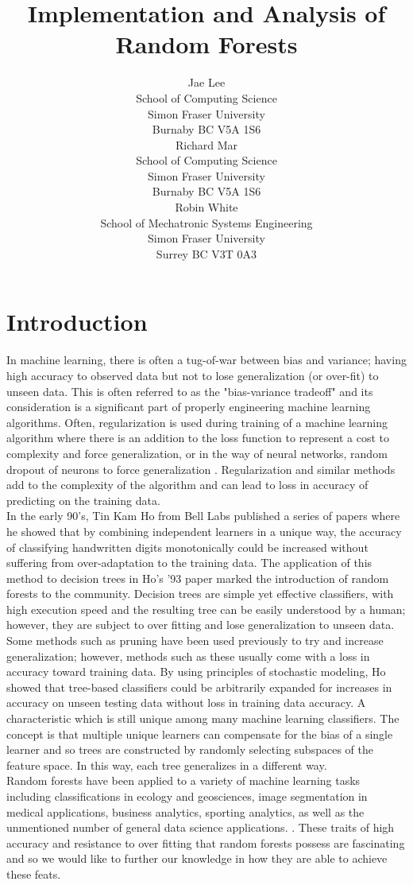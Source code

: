 \documentclass{article} %
\title{Implementation and Analysis of Random Forests}
\author{
Jae Lee\\
School of Computing Science\\
Simon Fraser University\\
Burnaby BC V5A 1S6 \\
\And
Richard Mar \\
School of Computing Science\\
Simon Fraser University\\
Burnaby BC V5A 1S6 \\
\AND
Robin White \\
School of Mechatronic Systems Engineering\\
Simon Fraser University\\
Surrey BC V3T 0A3 \\
}
\begin{document}
\maketitle

\section{Introduction}

In machine learning, there is often a tug-of-war between bias and variance; having high accuracy to observed data but not to lose generalization (or over-fit) to unseen data. This is often referred to as the "bias-variance tradeoff" and its consideration is a significant part of properly engineering machine learning algorithms. Often, regularization is used during training of a machine learning algorithm where there is an addition to the loss function to represent a cost to complexity and force generalization, or in the way of neural networks, random dropout of neurons to force generalization \cite{Srivastava2014}. Regularization and similar methods add to the complexity of the algorithm and can lead to loss in accuracy of predicting on the training data.\\
In the early 90's, Tin Kam Ho from Bell Labs published a series of papers where he showed that by combining independent learners in a unique way, the accuracy of classifying handwritten digits monotonically could be increased without suffering from over-adaptation to the training data. \cite{Ho93, Ho95, Ho98} The application of this method to decision trees in Ho's '93 paper marked the introduction of random forests to the community. \cite{Ho93} Decision trees are simple yet effective classifiers, with high execution speed and the resulting tree can be easily understood by a human; however, they are subject to over fitting and lose generalization to unseen data.  Some methods such as pruning have been used previously to try and increase generalization; however, methods such as these usually come with a loss in accuracy toward training data.  By using principles of stochastic modeling, Ho showed that tree-based classifiers could be arbitrarily expanded for increases in accuracy on unseen testing data without loss in training data accuracy. A characteristic which is still unique among many machine learning classifiers. The concept is that multiple unique learners can compensate for the bias of a single learner and so trees are constructed by randomly selecting subspaces of the feature space. In this way, each tree generalizes in a different way. \\
Random forests have been applied to a variety of machine learning tasks including classifications in ecology and geosciences, image segmentation in medical applications, business analytics, sporting analytics, as well as the unmentioned number of general data science applications. \cite{Cutler2007, Harris2015, Luo2017, Ghatasheh2014, Lock2014}.  These traits of high accuracy and resistance to over fitting that random forests possess are fascinating and so we would like to further our knowledge in how they are able to achieve these feats.
\end{document}
